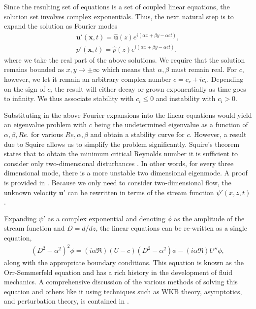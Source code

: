Since the resulting set of equations is a set of coupled linear equations, the solution set involves complex exponentials. Thus, the next natural step is to expand the solution as Fourier modes  
\begin{align}
\bm{u}'(\bm{x},t) = \hat{\bm{u}}(z)e^{i(\alpha x +\beta y -\alpha ct)},\\
p'(\bm{x},t) = \hat{p}(z)e^{i(\alpha x +\beta y -\alpha ct)},
\end{align}
where we take the real part of the above solutions. We require that the solution remains bounded as $x,y\rightarrow\pm\infty$ which means that $\alpha,\beta$ must remain real. For $c$, however, we let it remain an arbitrary complex number $c=c_{r} + ic_{i}$. Depending on the sign of $c_{i}$ the result will either decay or grown exponentially as time goes to infinity. We thus associate stability with $c_{i}\le 0$ and instability with $c_{i}>0$. 

Substituting in the above Fourier expansions into the linear equations would yield an eigenvalue problem with $c$ being the undetermined eigenvalue as a function of $\alpha,\beta,Re$.  for various $Re,\alpha,\beta$ and obtain a stability curve for $c$. However, a result due to Squire allows us to simplify the problem significantly. Squire's theorem states that to obtain the minimum critical Reynolds number it is sufficient to consider only two-dimensional disturbances \cite{drazinreid}. In other words, for every three dimensional mode, there is a more unstable two dimensional eigenmode. A proof is provided in \cite{drazinreid}.  Because we only need to consider two-dimensional flow, the unknown velocity $\bm{u}'$ can be rewritten in terms of the stream function $\psi'(x,z,t)$. 

Expanding $\psi'$ as a complex exponential and denoting $\phi$ as the amplitude of the stream function and $D=d/dz$, the linear equations can be re-written as a single equation, 
\begin{align}
(D^{2}-\alpha^{2})^{2}\phi = (i\alpha \Re)(U-c)(D^{2}-\alpha^{2})\phi -(i\alpha \Re)U''\phi,
\end{align}
along with the appropriate boundary conditions. This equation is known as the Orr-Sommerfeld equation and has a rich history in the development of fluid mechanics. A comprehensive discussion of the various methods of solving this equation and others like it using techniques such as WKB theory, asymptotics, and perturbation theory, is contained in \cite{drazinreid,vandyke,benderorszag}.


